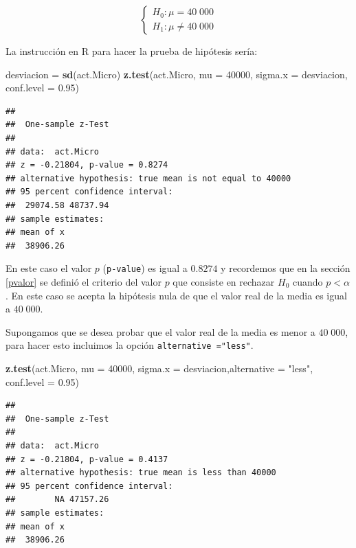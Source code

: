 \documentclass[
]{krantz}
\makeatletter
\newenvironment{Shaded}{\begin{snugshade}}{\end{snugshade}}
\newcommand{\DataTypeTok}[1]{\textcolor[rgb]{0.27,0.27,0.27}{#1}}
\newcommand{\DecValTok}[1]{\textcolor[rgb]{0.06,0.06,0.06}{#1}}
\newcommand{\FloatTok}[1]{\textcolor[rgb]{0.06,0.06,0.06}{#1}}
\newcommand{\KeywordTok}[1]{\textcolor[rgb]{0.27,0.27,0.27}{\textbf{#1}}}
\newcommand{\NormalTok}[1]{#1}
\newcommand{\StringTok}[1]{\textcolor[rgb]{0.5,0.5,0.5}{#1}}
\newenvironment{kframe}{%
\medskip{}
\setlength{\fboxsep}{.8em}
 \def\at@end@of@kframe{}%
 \ifinner\ifhmode%
  \def\at@end@of@kframe{\end{minipage}}%
  \begin{minipage}{\columnwidth}%
 \fi\fi%
 \def\FrameCommand##1{\hskip\@totalleftmargin \hskip-\fboxsep
 \colorbox{shadecolor}{##1}\hskip-\fboxsep
     \hskip-\linewidth \hskip-\@totalleftmargin \hskip\columnwidth}%
 \MakeFramed {\advance\hsize-\width
   \@totalleftmargin\z@ \linewidth\hsize
   \@setminipage}}%
 {\par\unskip\endMakeFramed%
 \at@end@of@kframe}
\renewenvironment{Shaded}{\begin{kframe}}{\end{kframe}}
\makeatother
\begin{document}
\begin{equation} 
\begin{cases} 
H_0: \mu = 40\;000 \\ 
H_1: \mu \neq 40\;000
\end{cases} 
\end{equation}

La instrucción en R para hacer la prueba de hipótesis sería:

\begin{Shaded}
\begin{Highlighting}[]
\NormalTok{desviacion =}\StringTok{ }\KeywordTok{sd}\NormalTok{(act.Micro)}
\KeywordTok{z.test}\NormalTok{(act.Micro, }\DataTypeTok{mu =} \DecValTok{40000}\NormalTok{, }\DataTypeTok{sigma.x =}\NormalTok{ desviacion, }\DataTypeTok{conf.level =} \FloatTok{0.95}\NormalTok{)}
\end{Highlighting}
\end{Shaded}

\begin{verbatim}
## 
##  One-sample z-Test
## 
## data:  act.Micro
## z = -0.21804, p-value = 0.8274
## alternative hypothesis: true mean is not equal to 40000
## 95 percent confidence interval:
##  29074.58 48737.94
## sample estimates:
## mean of x 
##  38906.26
\end{verbatim}

En este caso el valor \(p\) (\texttt{p-value}) es igual a \(0.8274\) y recordemos que en la sección \ref{pvalor} se definió el criterio del valor \(p\) que consiste en rechazar \(H_0\) cuando \(p < \alpha\). En este caso se acepta la hipótesis nula de que el valor real de la media es igual a \(40\;000\).

Supongamos que se desea probar que el valor real de la media es menor a \(40\;000\), para hacer esto incluimos la opción \texttt{alternative\ ="less"}.

\begin{Shaded}
\begin{Highlighting}[]
\KeywordTok{z.test}\NormalTok{(act.Micro, }\DataTypeTok{mu =} \DecValTok{40000}\NormalTok{, }\DataTypeTok{sigma.x =}\NormalTok{ desviacion,}\DataTypeTok{alternative =} \StringTok{"less"}\NormalTok{,  }\DataTypeTok{conf.level =} \FloatTok{0.95}\NormalTok{)}
\end{Highlighting}
\end{Shaded}

\begin{verbatim}
## 
##  One-sample z-Test
## 
## data:  act.Micro
## z = -0.21804, p-value = 0.4137
## alternative hypothesis: true mean is less than 40000
## 95 percent confidence interval:
##        NA 47157.26
## sample estimates:
## mean of x 
##  38906.26
\end{verbatim}
\end{document}
